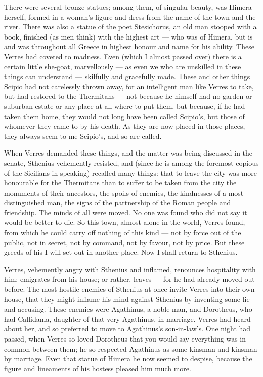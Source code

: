  There were several bronze statues; among them, of singular beauty, was Himera herself, formed in a woman's figure and dress from the name of the town and the river. There was also a statue of the poet Stesichorus, an old man stooped with a book, finished (as men think) with the highest art --- who was of Himera, but is and was throughout all Greece in highest honour and name for his ability. These Verres had coveted to madness. Even (which I almost passed over) there is a certain little she-goat, marvellously --- as even we who are unskilled in these things can understand --- skilfully and gracefully made. These and other things Scipio had not carelessly thrown away, for an intelligent man like Verres to take, but had restored to the Thermitans --- not because he himself had no garden or suburban estate or any place at all where to put them, but because, if he had taken them home, they would not long have been called Scipio's, but those of whomever they came to by his death. As they are now placed in those places, they always seem to me Scipio's, and so are called.

 When Verres demanded these things, and the matter was being discussed in the senate, Sthenius vehemently resisted, and (since he is among the foremost copious of the Sicilians in speaking) recalled many things: that to leave the city was more honourable for the Thermitans than to suffer to be taken from the city the monuments of their ancestors, the spoils of enemies, the kindnesses of a most distinguished man, the signs of the partnership of the Roman people and friendship. The minds of all were moved. No one was found who did not say it would be better to die. So this town, almost alone in the world, Verres found, from which he could carry off nothing of this kind --- not by force out of the public, not in secret, not by command, not by favour, not by price. But these greeds of his I will set out in another place. Now I shall return to Sthenius.

 Verres, vehemently angry with Sthenius and inflamed, renounces hospitality with him; emigrates from his house; or rather, leaves --- for he had already moved out before. The most hostile enemies of Sthenius at once invite Verres into their own house, that they might inflame his mind against Sthenius by inventing some lie and accusing. These enemies were Agathinus, a noble man, and Dorotheus, who had Callidama, daughter of that very Agathinus, in marriage. Verres had heard about her, and so preferred to move to Agathinus's son-in-law's. One night had passed, when Verres so loved Dorotheus that you would say everything was in common between them; he so respected Agathinus as some kinsman and kinsman by marriage. Even that statue of Himera he now seemed to despise, because the figure and lineaments of his hostess pleased him much more.

